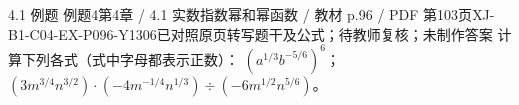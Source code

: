\par\noindent\begin{minipage}{\linewidth}
\begin{bankitem}{4.1 例题 例题4}{第4章 / 4.1 实数指数幂和幂函数 / 教材 p.96 / PDF 第103页}{XJ-B1-C04-EX-P096-Y1306}{已对照原页转写题干及公式；待教师复核；未制作答案}
计算下列各式（式中字母都表示正数）：
$\left(a^{1/3}b^{-5/6}\right)^6$；
$\left(3m^{3/4}n^{3/2}\right)\cdot\left(-4m^{-1/4}n^{1/3}\right)\div\left(-6m^{1/2}n^{5/6}\right)$。
\end{bankitem}
\end{minipage}\par\medskip
